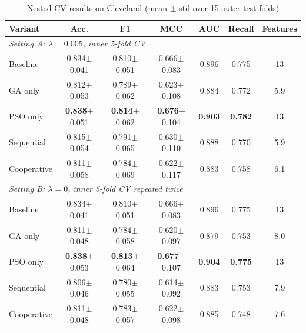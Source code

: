 \documentclass[MTech]{ugthesis}
\begin{document}
\begin{table}[htpb]
\small
\renewcommand{\arraystretch}{1.25}
\caption{Nested CV results on Cleveland (mean $\pm$ std over 15 outer test folds)}
\label{tab:ablation}
\begin{tabular}{|p{2.4cm}|c|c|c|c|c|c|}
\hline
\textbf{Variant} & \textbf{Acc.} & \textbf{F1} & \textbf{MCC} & \textbf{AUC} & \textbf{Recall} & \textbf{Features} \\ \hline
\multicolumn{7}{|l|}{\textit{Setting A: $\lambda=0.005$, inner 5-fold CV}} \\ \hline
Baseline    & 0.834$\pm$0.041 & 0.810$\pm$0.051 & 0.666$\pm$0.083 & 0.896 & 0.775 & 13 \\
GA only     & 0.812$\pm$0.053 & 0.789$\pm$0.062 & 0.623$\pm$0.108 & 0.884 & 0.772 & 5.9 \\
PSO only    & \textbf{0.838}$\pm$0.051 & \textbf{0.814}$\pm$0.062 & \textbf{0.676}$\pm$0.104 & \textbf{0.903} & \textbf{0.782} & 13 \\
Sequential  & 0.815$\pm$0.054 & 0.791$\pm$0.065 & 0.630$\pm$0.110 & 0.888 & 0.770 & 5.9 \\
Cooperative & 0.811$\pm$0.058 & 0.784$\pm$0.069 & 0.622$\pm$0.117 & 0.883 & 0.758 & 6.1 \\ \hline
\multicolumn{7}{|l|}{\textit{Setting B: $\lambda=0$, inner 5-fold CV repeated twice}} \\ \hline
Baseline    & 0.834$\pm$0.041 & 0.810$\pm$0.051 & 0.666$\pm$0.083 & 0.896 & 0.775 & 13 \\
GA only     & 0.811$\pm$0.048 & 0.784$\pm$0.058 & 0.620$\pm$0.097 & 0.879 & 0.753 & 8.0 \\
PSO only    & \textbf{0.838}$\pm$0.053 & \textbf{0.813}$\pm$0.064 & \textbf{0.677}$\pm$0.107 & \textbf{0.904} & \textbf{0.775} & 13 \\
Sequential  & 0.806$\pm$0.046 & 0.780$\pm$0.055 & 0.614$\pm$0.092 & 0.883 & 0.753 & 7.9 \\
Cooperative & 0.811$\pm$0.048 & 0.783$\pm$0.057 & 0.622$\pm$0.098 & 0.885 & 0.748 & 7.6 \\ \hline
\end{tabular}
\end{table}
\end{document}

